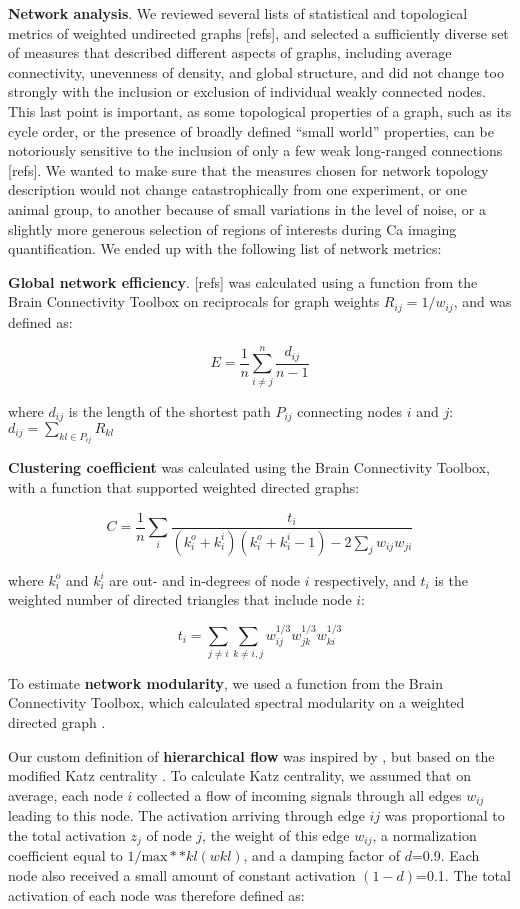 \documentclass{article}
\begin{document}
\textbf{Network analysis}. We reviewed several lists of statistical and topological metrics of weighted undirected graphs [refs], and selected a sufficiently diverse set of measures that described different aspects of graphs, including average connectivity, unevenness of density, and global structure, and did not change too strongly with the inclusion or exclusion of individual weakly connected nodes. This last point is important, as some topological properties of a graph, such as its cycle order, or the presence of broadly defined “small world” properties, can be notoriously sensitive to the inclusion of only a few weak long-ranged connections [refs]. We wanted to make sure that the measures chosen for network topology description would not change catastrophically from one experiment, or one animal group, to another because of small variations in the level of noise, or a slightly more generous selection of regions of interests during Ca imaging quantification. We ended up with the following list of network metrics:

\textbf{Global network efficiency}. [refs] was calculated using a function from the Brain Connectivity Toolbox \citep{rubinov2010toolbox} on reciprocals for graph weights $R_{ij} = 1/w_{ij}$, and was defined as:

$$E = \frac{1}{n} \sum_{i \neq j}^n{\frac{d_{ij}}{n-1}}$$

where $d_{ij}$ is the length of the shortest path $P_{ij}$ connecting nodes $i$ and $j$: $d_{ij} = \sum_{kl \in P_{ij}}{R_{kl}}$

\textbf{Clustering coefficient} \citep{fagiolo2007} was calculated using the Brain Connectivity Toolbox, with a function that supported weighted directed graphs:

$$C = \frac{1}{n} \sum_i{\frac {t_i}{(k^o_i+k^i_i)(k^o_i+k^i_i-1)-2\sum_j{w_{ij}w_{ji}}}}$$

where $k^o_i$ and $k^i_i$ are out- and in-degrees of node $i$ respectively, and $t_i$ is the weighted number of directed triangles that include node $i$:

$$t_i = \sum_{j \neq i}{\sum_{k \neq i,j}{w^{1/3}_{ij}w^{1/3}_{jk}w^{1/3}_{ki}}}$$

To estimate \textbf{network modularity}, we used a function from the Brain Connectivity Toolbox, which calculated spectral modularity on a weighted directed graph \citep{reichardt2006community,leicht2008community}.

Our custom definition of \textbf{hierarchical flow} was inspired by \citep{mones2012hierarchy,mones2012hierarchy}, but based on the modified Katz centrality \citep{katz1953original,fletcher2018katz}. To calculate Katz centrality, we assumed that on average, each node $i$ collected a flow of incoming signals through all edges $w_{ij}$ leading to this node. The activation arriving through edge $ij$ was proportional to the total activation $z_j$ of node $j$, the weight of this edge $w_{ij}$, a normalization coefficient equal to $1/\text{max}*{*kl}(w{kl})$, and a damping factor of $d$=0.9. Each node also received a small amount of constant activation $(1-d)$=0.1. The total activation of each node was therefore defined as:
\end{document}
